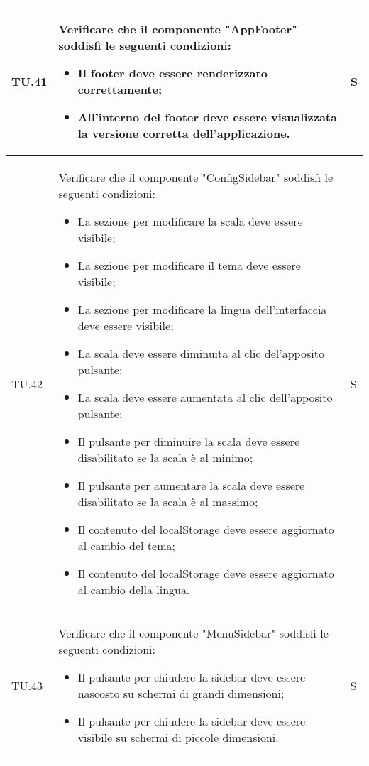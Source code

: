 \begin{adjustwidth}{-0.5cm}{-0.5cm}
\begin{longtable}{|P{1.5cm}|>{\raggedright}P{9.5cm}|>{\arraybackslash}P{1.5cm}|}
		\hline TU.41 & Verificare che il componente "AppFooter" soddisfi le seguenti condizioni:
    \begin{itemize}
      \item Il footer deve essere renderizzato correttamente;
			\item All'interno del footer deve essere visualizzata la versione corretta dell'applicazione.
    \end{itemize} & S \\

		\hline TU.42 & Verificare che il componente "ConfigSidebar" soddisfi le seguenti condizioni:
    \begin{itemize}
      \item La sezione per modificare la scala deve essere visibile;
			\item La sezione per modificare il tema deve essere visibile;
			\item La sezione per modificare la lingua dell'interfaccia deve essere visibile;
			\item La scala deve essere diminuita al clic del'apposito pulsante;
			\item La scala deve essere aumentata al clic dell'apposito pulsante;
			\item Il pulsante per diminuire la scala deve essere disabilitato se la scala è al minimo;
			\item Il pulsante per aumentare la scala deve essere disabilitato se la scala è al massimo;
			\item Il contenuto del localStorage deve essere aggiornato al cambio del tema;
			\item Il contenuto del localStorage deve essere aggiornato al cambio della lingua.
    \end{itemize} & S \\

		\hline TU.43 & Verificare che il componente "MenuSidebar" soddisfi le seguenti condizioni:
    \begin{itemize}
			\item Il pulsante per chiudere la sidebar deve essere nascosto su schermi di grandi dimensioni;
      \item Il pulsante per chiudere la sidebar deve essere visibile su schermi di piccole dimensioni.
    \end{itemize} & S \\


\end{longtable}
\end{adjustwidth}
